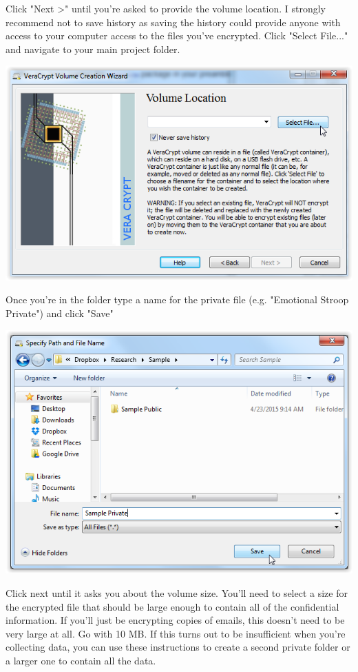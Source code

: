 \documentclass[12pt]{article}
\begin{document}
Click "Next >" until you're asked to provide the volume location. I strongly recommend not to
save history as saving the history could provide anyone with access to your computer access
to the files you've encrypted. Click "Select File..." and navigate to your main project folder.

\includegraphics{imgs/VC03.PNG}

Once you're in the folder type a name for the private file (e.g. "Emotional Stroop Private")
and click "Save"

\includegraphics{imgs/VC04.PNG}

Click next until it asks you about the volume size. You'll need to select a size for the
encrypted file that should be large enough to contain all of the confidential information.
If you'll just be encrypting copies of emails, this doesn't need to be very large at all.
Go with 10 MB. If this turns out to be insufficient when you're collecting data, you can
use these instructions to create a second private folder or a larger one to contain all
the data.
\end{document}
